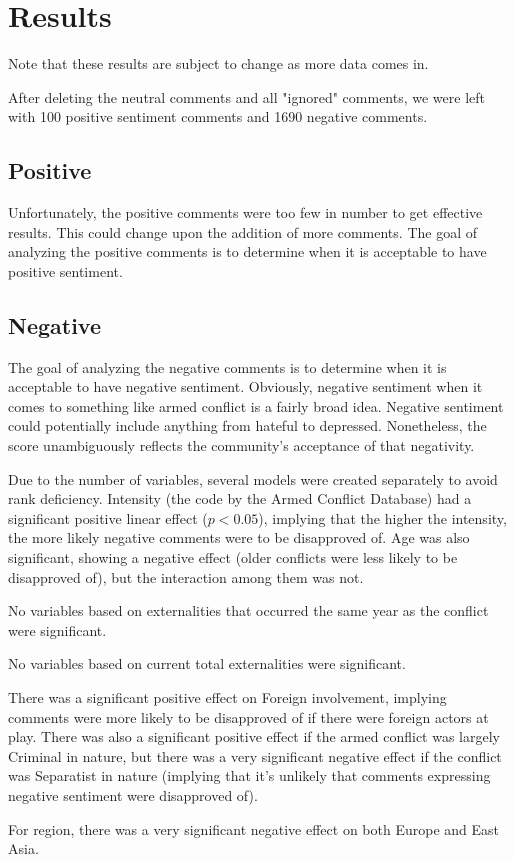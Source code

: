 \section{Results}
Note that these results are subject to change as more data comes in.

After deleting the neutral comments and all "ignored" comments, we were left with 100 positive sentiment comments and 1690 negative comments.

\subsection{Positive}
Unfortunately, the positive comments were too few in number to get effective results. This could change upon the addition of more comments. The goal of analyzing the positive comments is to determine when it is acceptable to have positive sentiment.

\subsection{Negative}
The goal of analyzing the negative comments is to determine when it is acceptable to have negative sentiment. Obviously, negative sentiment when it comes to something like armed conflict is a fairly broad idea. Negative sentiment could potentially include anything from hateful to depressed. Nonetheless, the score unambiguously reflects the community's acceptance of that negativity.

Due to the number of variables, several models were created separately to avoid rank deficiency. Intensity (the code by the Armed Conflict Database) had a significant positive linear effect ($p < 0.05$), implying that the higher the intensity, the more likely negative comments were to be disapproved of. Age was also significant, showing a negative effect (older conflicts were less likely to be disapproved of), but the interaction among them was not.

No variables based on externalities that occurred the same year as the conflict were significant.

No variables based on current total externalities were significant.

There was a significant positive effect on Foreign involvement, implying comments were more likely to be disapproved of if there were foreign actors at play. There was also a significant positive effect if the armed conflict was largely Criminal in nature, but there was a very significant negative effect if the conflict was Separatist in nature (implying that it's unlikely that comments expressing negative sentiment were disapproved of).

For region, there was a very significant negative effect on both Europe and East Asia.